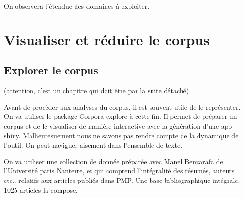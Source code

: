 \documentclass[
]{book}
\begin{document}
On observera l'étendue des domaines à exploiter.

\hypertarget{visualiser-et-ruxe9duire-le-corpus}{%
\chapter{Visualiser et réduire le corpus}\label{visualiser-et-ruxe9duire-le-corpus}}

\hypertarget{explorer-le-corpus}{%
\section{Explorer le corpus}\label{explorer-le-corpus}}

(attention, c'est un chapitre qui doit être par la suite détaché)

Avant de procéder aux analyses du corpus, il est souvent utile de le représenter. On va utiliser le package Corpora explore à cette fin. Il permet de préparer un corpus et de le visualiser de manière interactive avec la génération d'une app shiny. Malheuresuement nous ne savons pas rendre compte de la dynamique de l'outil. On peut naviguer aisement dans l'ensemble de texte.

On va utiliser une collection de donnée préparée avec Manel Benzarafa de l'Université paris Nanterre, et qui comprend l'intégralité des résumés, auteurs etc.. relatifs aux articles publiés dans PMP. Une base bibliographique intégrale. 1025 articles la compose.
\end{document}
